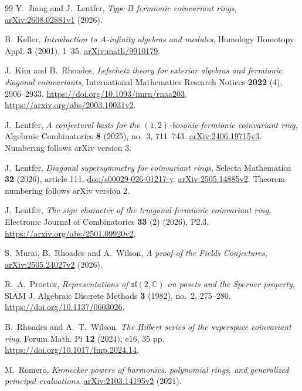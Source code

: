 \begin{thebibliography}{99}
Y.~Jiang and J.~Lentfer,
\emph{Type $B$ fermionic coinvariant rings},
\href{https://arxiv.org/abs/2608.02881v1}{arXiv:\allowbreak 2608.02881v1} (2026).

B.~Keller, \emph{Introduction to $A$-infinity algebras and modules},
Homology Homotopy Appl. \textbf{3} (2001), 1--35.
\href{https://arxiv.org/abs/math/9910179}{arXiv:math/9910179}.

J.~Kim and B.~Rhoades,
\emph{Lefschetz theory for exterior algebras and fermionic diagonal coinvariants},
International Mathematics Research Notices \textbf{2022} (4), 2906--2933.
\url{https://doi.org/10.1093/imrn/rnaa203}.
\url{https://arxiv.org/abs/2003.10031v2}.

J.~Lentfer,
\emph{A conjectural basis for the $(1,2)$-bosonic-fermionic
coinvariant ring},
Algebraic Combinatorics \textbf{8} (2025), no.~3, 711--743.
\href{https://arxiv.org/abs/2406.19715v3}{arXiv:\allowbreak 2406.19715v3}.
Numbering follows arXiv version 3.

J.~Lentfer,
\emph{Diagonal supersymmetry for coinvariant rings},
Selecta Mathematica \textbf{32} (2026), article 111.
\href{https://doi.org/10.1007/s00029-026-01217-y}{doi:/s00029-026-01217-y}.
\href{https://arxiv.org/abs/2505.14885v2}{arXiv:\allowbreak 2505.14885v2}.
Theorem numbering follows arXiv version 2.

J.~Lentfer,
\emph{The sign character of the triagonal fermionic coinvariant ring},
Electronic Journal of Combinatorics \textbf{33} (2) (2026), P2.3.
\url{https://arxiv.org/abs/2501.09920v2}.

S.~Murai, B.~Rhoades and A.~Wilson,
\emph{A proof of the Fields Conjectures},
\href{https://arxiv.org/abs/2505.24027v2}{arXiv:\allowbreak 2505.24027v2} (2026).

R.~A.~Proctor,
\emph{Representations of $\mathfrak{sl}(2,\mathbb C)$ on posets
and the Sperner property},
SIAM J. Algebraic Discrete Methods \textbf{3} (1982), no.~2, 275--280.
\url{https://doi.org/10.1137/0603026}.

B.~Rhoades and A.~T.~Wilson,
\emph{The Hilbert series of the superspace coinvariant ring},
Forum Math. Pi \textbf{12} (2024), e16, 35 pp.
\url{https://doi.org/10.1017/fmp.2024.14}.

M.~Romero,
\emph{Kronecker powers of harmonics, polynomial rings, and
generalized principal evaluations}, \href{https://arxiv.org/abs/2103.14195v2}{arXiv:\allowbreak 2103.14195v2} (2021).


\end{thebibliography}
